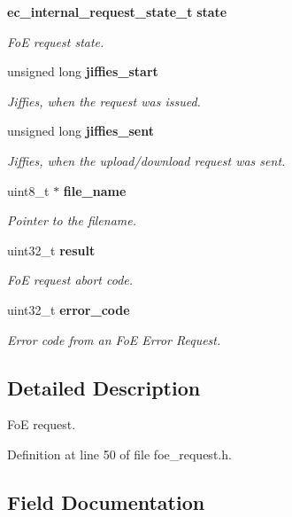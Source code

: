\begin{DoxyCompactItemize}
{\bf ec\-\_\-internal\-\_\-request\-\_\-state\-\_\-t} {\bf state}
\begin{DoxyCompactList}\small\item\em Fo\-E request state. \end{DoxyCompactList}\item 
unsigned long {\bf jiffies\-\_\-start}
\begin{DoxyCompactList}\small\item\em Jiffies, when the request was issued. \end{DoxyCompactList}\item 
unsigned long {\bf jiffies\-\_\-sent}
\begin{DoxyCompactList}\small\item\em Jiffies, when the upload/download request was sent. \end{DoxyCompactList}\item 
uint8\-\_\-t $\ast$ {\bf file\-\_\-name}
\begin{DoxyCompactList}\small\item\em Pointer to the filename. \end{DoxyCompactList}\item 
uint32\-\_\-t {\bf result}
\begin{DoxyCompactList}\small\item\em Fo\-E request abort code. \end{DoxyCompactList}\item 
uint32\-\_\-t {\bf error\-\_\-code}
\begin{DoxyCompactList}\small\item\em Error code from an Fo\-E Error Request. \end{DoxyCompactList}\end{DoxyCompactItemize}


\subsection{Detailed Description}
Fo\-E request. 

Definition at line 50 of file foe\-\_\-request.\-h.



\subsection{Field Documentation}
